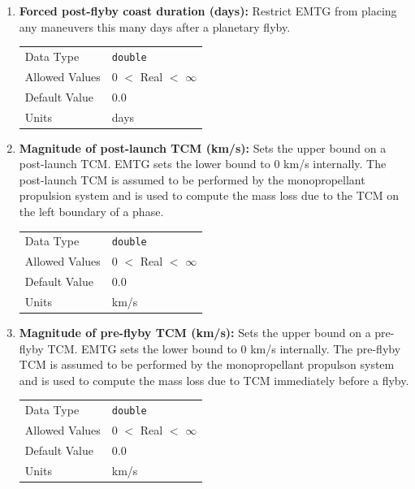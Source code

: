\begin{enumerate}
    \item \textbf{Forced post-flyby coast duration (days):} Restrict \ac{EMTG} from placing any maneuvers this many days after a planetary flyby.
    
        \begin{table}[H]
            \hspace{2cm}
            \begin{tabular}{ll}
            Data Type & \verb|double| \\
            Allowed Values & 0 $<$ Real $<$ $\infty$ \\
            Default Value & 0.0 \\
            Units & days
            \end{tabular}
        \end{table}

    \item \textbf{Magnitude of post-launch TCM (km/s):} Sets the upper bound on a post-launch TCM. \ac{EMTG} sets the lower bound to 0 km/s internally. The post-launch TCM is assumed to be performed by the monopropellant propulsion system and is used to compute the mass loss due to the TCM on the left boundary of a phase.
    
        \begin{table}[H]
            \hspace{2cm}
            \begin{tabular}{ll}
            Data Type & \verb|double| \\
            Allowed Values & 0 $<$ Real $<$ $\infty$ \\
            Default Value & 0.0 \\
            Units & km/s
            \end{tabular}
        \end{table}

    \item \textbf{Magnitude of pre-flyby TCM (km/s):} Sets the upper bound on a pre-flyby TCM. \ac{EMTG} sets the lower bound to 0 km/s internally. The pre-flyby TCM is assumed to be performed by the monopropellant propulson system and is used to compute the mass loss due to TCM immediately before a flyby.

        \begin{table}[H]
            \hspace{2cm}
            \begin{tabular}{ll}
            Data Type & \verb|double| \\
            Allowed Values & 0 $<$ Real $<$ $\infty$ \\
            Default Value & 0.0 \\
            Units & km/s
            \end{tabular}
        \end{table}


\end{enumerate}
